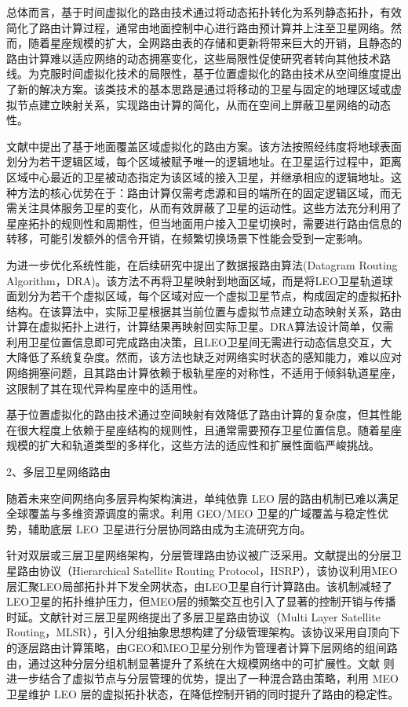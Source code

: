 \documentclass[print, master, vlined]{DissertUESTC}
\begin{document}
    总体而言，基于时间虚拟化的路由技术通过将动态拓扑转化为系列静态拓扑，有效简化了路由计算过程，通常由地面控制中心进行路由预计算并上注至卫星网络。然而，随着星座规模的扩大，全网路由表的存储和更新将带来巨大的开销，且静态的路由计算难以适应网络的动态拥塞变化，这些局限性促使研究者转向其他技术路线。为克服时间虚拟化技术的局限性，基于位置虚拟化的路由技术从空间维度提出了新的解决方案。该类技术的基本思路是通过将移动的卫星与固定的地理区域或虚拟节点建立映射关系，实现路由计算的简化，从而在空间上屏蔽卫星网络的动态性。
    
    文献\cite{ekici2000datagram}中提出了基于地面覆盖区域虚拟化的路由方案。该方法按照经纬度将地球表面划分为若干逻辑区域，每个区域被赋予唯一的逻辑地址。在卫星运行过程中，距离区域中心最近的卫星被动态指定为该区域的接入卫星，并继承相应的逻辑地址。这种方法的核心优势在于：路由计算仅需考虑源和目的端所在的固定逻辑区域，而无需关注具体服务卫星的变化，从而有效屏蔽了卫星的运动性。这些方法充分利用了星座拓扑的规则性和周期性，但当地面用户接入卫星切换时，需要进行路由信息的转移，可能引发额外的信令开销，在频繁切换场景下性能会受到一定影响。
    
    为进一步优化系统性能，在后续研究\cite{ekici2002distributed}中提出了数据报路由算法(Datagram Routing Algorithm，DRA)。该方法不再将卫星映射到地面区域，而是将LEO卫星轨道球面划分为若干个虚拟区域，每个区域对应一个虚拟卫星节点，构成固定的虚拟拓扑结构。在该算法中，实际卫星根据其当前位置与虚拟节点建立动态映射关系，路由计算在虚拟拓扑上进行，计算结果再映射回实际卫星。DRA算法设计简单，仅需利用卫星位置信息即可完成路由决策，且LEO卫星间无需进行动态信息交互，大大降低了系统复杂度。然而，该方法也缺乏对网络实时状态的感知能力，难以应对网络拥塞问题，且其路由计算依赖于极轨星座的对称性，不适用于倾斜轨道星座，这限制了其在现代异构星座中的适用性。
    
    基于位置虚拟化的路由技术通过空间映射有效降低了路由计算的复杂度，但其性能在很大程度上依赖于星座结构的规则性，且通常需要预存卫星位置信息。随着星座规模的扩大和轨道类型的多样化，这些方法的适应性和扩展性面临严峻挑战。

    2、多层卫星网络路由
    
    随着未来空间网络向多层异构架构演进，单纯依靠 LEO 层的路由机制已难以满足全球覆盖与多维资源调度的需求。利用 GEO/MEO 卫星的广域覆盖与稳定性优势，辅助底层 LEO 卫星进行分层协同路由成为主流研究方向。

    针对双层或三层卫星网络架构，分层管理路由协议被广泛采用。文献\cite{lee2000satellite}提出的分层卫星路由协议（Hierarchical Satellite Routing Protocol，HSRP），该协议利用MEO层汇聚LEO局部拓扑并下发全网状态，由LEO卫星自行计算路由。该机制减轻了LEO卫星的拓扑维护压力，但MEO层的频繁交互也引入了显著的控制开销与传播时延。文献\cite{akyildiz2002mlsr}针对三层卫星网络提出了多层卫星路由协议（Multi Layer Satellite Routing，MLSR），引入分组抽象思想构建了分级管理架构。该协议采用自顶向下的逐层路由计算策略，由GEO和MEO卫星分别作为管理者计算下层网络的组间路由，通过这种分层分组机制显著提升了系统在大规模网络中的可扩展性。文献\cite{zhou2007novel} 则进一步结合了虚拟节点与分层管理的优势，提出了一种混合路由策略，利用 MEO 卫星维护 LEO 层的虚拟拓扑状态，在降低控制开销的同时提升了路由的稳定性。
    
\end{document}
